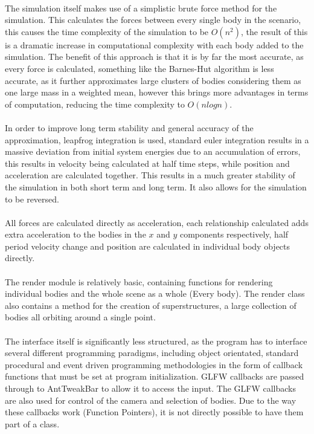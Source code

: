\paragraph{}
The simulation itself makes use of a simplistic brute force method for the simulation. This calculates the forces between every single body in the scenario, this causes the time complexity of the simulation to be $O(n^2)$, the result of this is a dramatic increase in computational complexity with each body added to the simulation. The benefit of this approach is that it is by far the most accurate, as every force is calculated, something like the Barnes-Hut algorithm is less accurate, as it further approximates large clusters of bodies considering them as one large mass in a weighted mean, however this brings more advantages in terms of computation, reducing the time complexity to $O(nlogn)$.

\paragraph{}
In order to improve long term stability and general accuracy of the approximation, leapfrog integration is used, standard euler integration results in a massive deviation from initial system energies due to an accumulation of errors, this results in velocity being calculated at half time steps, while position and acceleration are calculated together. This results in a much greater stability of the simulation in both short term and long term. It also allows for the simulation to be reversed.

\paragraph{}
All forces are calculated directly as acceleration, each relationship calculated adds extra acceleration to the bodies in the $x$ and $y$ components respectively, half period velocity change and position are calculated in individual body objects directly.

\paragraph{}
The render module is relatively basic, containing functions for rendering individual bodies and the whole scene as a whole (Every body). The render class also contains a method for the creation of superstructures, a large collection of bodies all orbiting around a single point.

\paragraph{}
The interface itself is significantly less structured, as the program has to interface several different programming paradigms, including object orientated, standard procedural and event driven programming methodologies in the form of callback functions that must be set at program initialization. GLFW callbacks are passed through to AntTweakBar to allow it to access the input. The GLFW callbacks are also used for control of the camera and selection of bodies. Due to the way these callbacks work (Function Pointers), it is not directly possible to have them part of a class.

